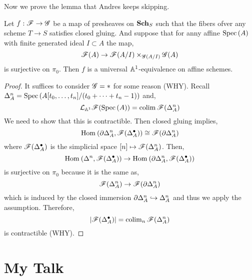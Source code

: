 \documentclass[12pt]{article}
\newcommand{\st}{\mathrm{st}}
\begin{document}

\begin{rmk}
Now we prove the lemma that Andres keeps skipping. 
\end{rmk}

\begin{lemma}[4.1]
Let $f : \mathscr{F} \to \mathscr{G}$ be a map of presheaves on $\mathbf{Sch}_S$ such that the fibers ofver any scheme $T \to S$ satisfies closed gluing. And suppose that for anny affine $\mathrm{Spec}\left( A \right)$ with finite generated ideal $I \subset A$ the map,
\[ \mathscr{F}(A) \to \mathscr{F}(A/I) \times_{\mathscr{G}(A/I)} \mathscr{G}(A) \]
is surjective on $\pi_0$. Then $f$ is a universal $\mathbb{A}^1$-equivalence on affine schemes.
\end{lemma}

\begin{proof}
It suffices to consider $\mathscr{G} = *$ for some reason (WHY).
Recall $\Delta^n_A = \mathrm{Spec}\left( A[t_0, \dots, t_n]/( t_0 + \cdots + t_n - 1) \right)$ and,
\[ \mathcal{L}_{\mathbb{A}^1} \mathscr{F}(\mathrm{Spec}\left( A \right)) = \operatorname{\mathrm{colim}} \mathscr{F}(\Delta_A^n) \]
We need to show that this is contractible. Then closed gluing implies,
\[ \mathrm{Hom}_{} \left( \partial \Delta^n_A, \mathscr{F}(\Delta_A^\bullet) \right) \cong \mathscr{F}(\partial \Delta_A^n) \]
where $\mathscr{F}(\Delta_A^\bullet)$ is the simplicial space $[n] \mapsto \mathscr{F}(\Delta_A^n)$. Then,
\[ \mathrm{Hom}_{} \left( \Delta^n, \mathscr{F}(\Delta^\bullet_A) \right) \to \mathrm{Hom}_{} \left( \partial \Delta_A^n, \mathscr{F}(\Delta_A^\bullet) \right) \]
is surjective on $\pi_0$ because it is the same as,
\[ \mathscr{F}(\Delta_A^n) \to \mathscr{F}(\partial \Delta_A^n) \]
which is induced by the closed immersion $\partial \Delta^n_A \hookrightarrow \Delta^n_A$ and thus we apply the assumption. Therefore,
\[ | \mathscr{F}(\Delta_A^\bullet) | = \operatorname{\mathrm{colim}}_n \mathscr{F}(\Delta_A^n) \] 
is contractible (WHY).
\end{proof}


\section{My Talk}

\newcommand{\Aconn}[1]{\A^1\text{-}(#1)\text{-connected}}
\newcommand{\cV}{\mathcal{V}}
\end{document}
